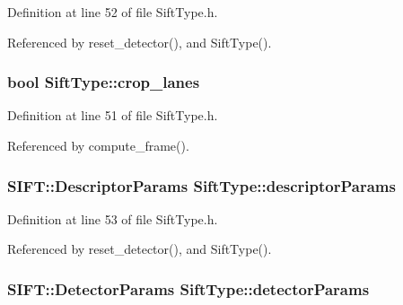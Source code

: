 \-Definition at line 52 of file \-Sift\-Type.\-h.



\-Referenced by reset\-\_\-detector(), and \-Sift\-Type().

\hypertarget{class_sift_type_a95e6ce70f1e21aca352be83a46b8eefa}{
\subsubsection[{crop\-\_\-lanes}]{\setlength{\rightskip}{0pt plus 5cm}bool {\bf \-Sift\-Type\-::crop\-\_\-lanes}}}
\label{class_sift_type_a95e6ce70f1e21aca352be83a46b8eefa}


\-Definition at line 51 of file \-Sift\-Type.\-h.



\-Referenced by compute\-\_\-frame().

\hypertarget{class_sift_type_a78c132604daeaedb318e9e41a9e968b0}{
\subsubsection[{descriptor\-Params}]{\setlength{\rightskip}{0pt plus 5cm}\-S\-I\-F\-T\-::\-Descriptor\-Params {\bf \-Sift\-Type\-::descriptor\-Params}}}
\label{class_sift_type_a78c132604daeaedb318e9e41a9e968b0}


\-Definition at line 53 of file \-Sift\-Type.\-h.



\-Referenced by reset\-\_\-detector(), and \-Sift\-Type().

\hypertarget{class_sift_type_ae75dfe4dae3528a272cff29c04723dc9}{
\subsubsection[{detector\-Params}]{\setlength{\rightskip}{0pt plus 5cm}\-S\-I\-F\-T\-::\-Detector\-Params {\bf \-Sift\-Type\-::detector\-Params}}}
\label{class_sift_type_ae75dfe4dae3528a272cff29c04723dc9}


